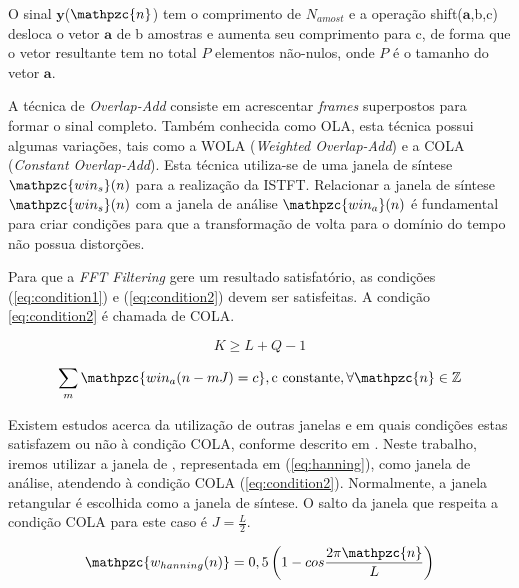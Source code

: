         O sinal $\mathbf{y}$($\mathpzc{n}$) tem o comprimento de $N_{amost}$ e a operação shift($\mathbf{a}$,b,c) desloca o vetor $\mathbf{a}$ de b amostras e aumenta seu comprimento para c, de forma que o vetor resultante tem no total $P$ elementos não-nulos, onde $P$ é o tamanho do vetor $\mathbf{a}$.
        
        A técnica de \textit{Overlap-Add} consiste em acrescentar \textit{frames} superpostos para formar o sinal completo. Também conhecida como OLA, esta técnica possui algumas variações, tais como a WOLA (\textit{Weighted Overlap-Add}) e a COLA (\textit{Constant Overlap-Add}). Esta técnica utiliza-se de uma janela de síntese $\mathpzc{win_s}(n)$ para a realização da ISTFT. Relacionar a janela de síntese $\mathpzc{win_s}(n)$ com a janela de análise $\mathpzc{win_a}(n)$ é fundamental para criar condições para que a transformação de volta para o domínio do tempo não possua distorções. 
        
        Para que a \textit{FFT Filtering} gere um resultado satisfatório, as condições (\ref{eq:condition1}) e (\ref{eq:condition2}) devem ser satisfeitas. A condição \ref{eq:condition2} é chamada de COLA.
        
        \begin{equation}\label{eq:condition1}
            K \geq L + Q - 1
        \end{equation}
        
        \begin{equation}\label{eq:condition2}
            \sum_m \mathpzc{win_a(n - mJ) = c},\text{c constante}, \forall\mathpzc{n} \in \mathbb{Z}
        \end{equation}
 
        
        Existem estudos acerca da utilização de outras janelas e em quais condições estas satisfazem ou não à condição COLA, conforme descrito em \cite{LuizVictorio}. Neste trabalho, iremos utilizar a janela de , representada em (\ref{eq:hanning}), como janela de análise, atendendo à condição COLA (\ref{eq:condition2}). Normalmente, a janela retangular é escolhida como a janela de síntese. O salto da janela que respeita a condição COLA para este caso é $J = \frac{L}{2}$.
        
        \begin{equation}\label{eq:hanning}
            \mathpzc{w_{hanning}(n)} = 0,5 \left( 1 - cos\frac{2\pi\mathpzc{n}}{L}\right)
        \end{equation}
        

